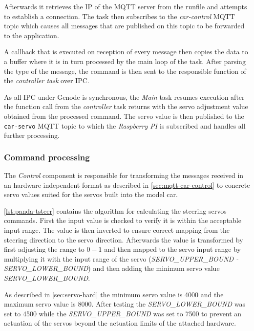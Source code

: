 Afterwards it retrieves the IP of the MQTT server from the runfile and attempts to establish a connection.
The task then subscribes to the \textit{car-control} MQTT topic which causes all messages that are published on this topic to be forwarded to the application.

A callback that is executed on reception of every message then copies the data to a buffer where it is in turn processed by the main loop of the task.
After parsing the type of the message, the command is then sent to the responsible function of the \textit{controller task} over IPC.

As all IPC under Genode is synchronous, the \textit{Main} task resumes execution after the function call from the \textit{controller} task returns with the servo adjustment value obtained from the processed command.
The servo value is then published to the \texttt{car-servo} MQTT topic to which the \textit{Raspberry PI} is subscribed and handles all further processing.


\subsubsection{Command processing}
\label{sec:panda-convert}
The \textit{Control} component is responsible for transforming the messages received in an hardware independent format as described in \autoref{sec:mqtt-car-control} to concrete servo values suited for the servos built into the model car.

\autoref{lst:panda-tsteer} contains the algorithm for calculating the steering servos commands.
First the input value is checked to verify it is within the acceptable input range.
The value is then inverted to ensure correct mapping from the steering direction to the servo direction.
Afterwards the value is transformed by first adjusting the range to $0-1$ and then mapped to the servo input range by multiplying it with the input range of the servo (\textit{SERVO\_UPPER\_BOUND - SERVO\_LOWER\_BOUND}) and then adding the minimum servo value \textit{SERVO\_LOWER\_BOUND}.

As described in \autoref{sec:servo-hard} the minimum servo value is 4000 and the maximum servo value is 8000.
After testing the \textit{SERVO\_LOWER\_BOUND} was set to 4500 while the \textit{SERVO\_UPPER\_BOUND} was set to 7500 to prevent an actuation of the servos beyond the actuation limits of the attached hardware. \\

